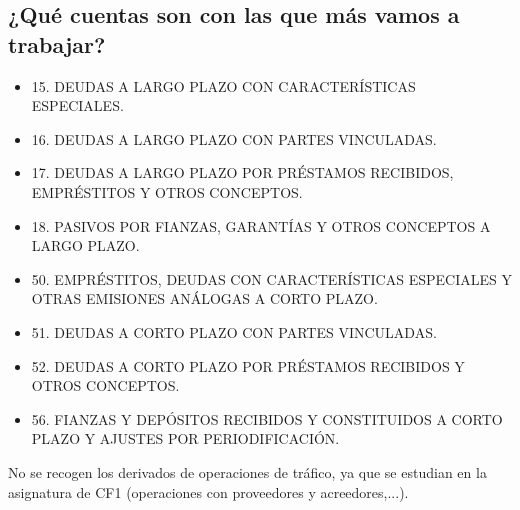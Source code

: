 \subsection{¿Qué cuentas son con las que más vamos a trabajar?}


\begin{itemize}
    \item 15. DEUDAS A LARGO PLAZO CON CARACTERÍSTICAS ESPECIALES.
    \item 16. DEUDAS A LARGO PLAZO CON PARTES VINCULADAS.
    \item 17. DEUDAS A LARGO PLAZO POR PRÉSTAMOS RECIBIDOS, EMPRÉSTITOS Y OTROS CONCEPTOS.
    \item 18. PASIVOS POR FIANZAS, GARANTÍAS Y OTROS CONCEPTOS A LARGO PLAZO.
    \end{itemize}

    \begin{itemize}
        \item 50. EMPRÉSTITOS, DEUDAS CON CARACTERÍSTICAS ESPECIALES Y OTRAS EMISIONES ANÁLOGAS A CORTO PLAZO.
        \item 51. DEUDAS A CORTO PLAZO CON PARTES VINCULADAS.
        \item 52. DEUDAS A CORTO PLAZO POR PRÉSTAMOS RECIBIDOS Y OTROS CONCEPTOS.
        \item 56. FIANZAS Y DEPÓSITOS RECIBIDOS Y CONSTITUIDOS A CORTO PLAZO Y AJUSTES POR PERIODIFICACIÓN.
    \end{itemize}

No se recogen los derivados de operaciones de tráfico, ya que se estudian en la asignatura de CF1 (operaciones con proveedores y acreedores,...).



